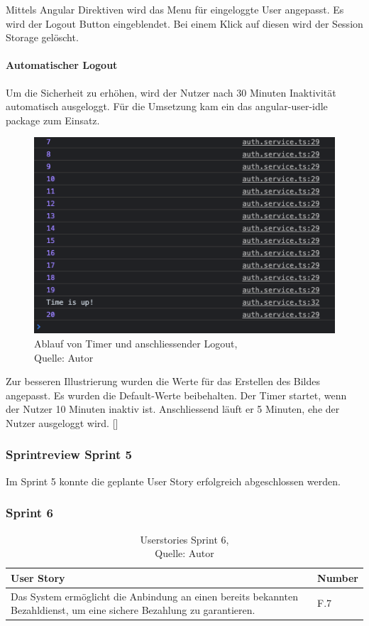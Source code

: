  Mittels Angular Direktiven wird das Menu für eingeloggte User angepasst. Es wird der Logout Button eingeblendet. Bei einem Klick auf diesen wird der Session Storage gelöscht. 
 
 \paragraph{Automatischer Logout}
 Um die Sicherheit zu erhöhen, wird der Nutzer nach 30 Minuten Inaktivität automatisch ausgeloggt. Für die Umsetzung kam ein das angular-user-idle package zum Einsatz. 
 
 \begin{figure}[H]
 	\centering
 	\includegraphics[scale=0.5]{images/idle.PNG}
 	\caption[Ablauf von Timer und anschliessender Logout]{Ablauf von Timer und anschliessender Logout,\\ Quelle: Autor}
 	\label{img: autoLogout}
 \end{figure} 
Zur besseren Illustrierung wurden die Werte für das Erstellen des Bildes angepasst. 
Es wurden die Default-Werte beibehalten. Der Timer startet, wenn der Nutzer 10 Minuten inaktiv ist. Anschliessend läuft er 5 Minuten, ehe der Nutzer ausgeloggt wird. [\cite{idle}]
 
\subsubsection{Sprintreview Sprint 5}
 Im Sprint 5 konnte die geplante User Story erfolgreich abgeschlossen werden.
 
 
\subsubsection{Sprint 6}
\begin{table}[H]
	\setlength\extrarowheight{2pt} %
	\begin{tabularx}{\textwidth}{|X|l|}
		\hline
		\textbf{User Story} & \textbf{Number} \\
		\hline
		Das System ermöglicht die Anbindung an einen bereits bekannten Bezahldienst, 
		um eine sichere Bezahlung zu garantieren.& F.7\\
		\hline
	\end{tabularx} 
	\caption[Userstories Sprint 6]{Userstories Sprint 6,\\ Quelle: Autor}
\end{table}\label{userStoriesSprint6}
